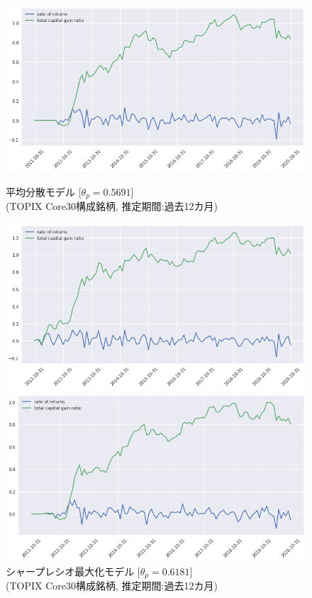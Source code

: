 \documentclass[dvipdfmx,autodetect-engine]{jsarticle}
\begin{document}
\begin{figure}[htbp]
\begin{minipage}{0.5\hsize}
\begin{center}
\includegraphics[width=1.0\hsize]{./figures/mmvp_tpx30_w=12_plot.png}
\end{center}
\caption{平均分散モデル [$\theta_p=0.5691$]\\(TOPIX Core30構成銘柄, 推定期間:過去12カ月)}
\label{fig:11}
\end{minipage}
\begin{minipage}{0.5\hsize}
\begin{center}
\includegraphics[width=1.0\hsize]{./figures/srmp_tpx30_w=12_plot.png}
\end{center}
\caption{シャープレシオ最大化モデル [$\theta_p=0.6181$]\\(TOPIX Core30構成銘柄, 推定期間:過去12カ月)}
\label{fig:12}
\end{minipage}
\begin{minipage}{0.5\hsize}
\begin{center}
\includegraphics[width=1.0\hsize]{./figures/mmvp_tpx30_w=36_plot.png}

\end{center}
\end{minipage}
\end{figure}
\end{document}
